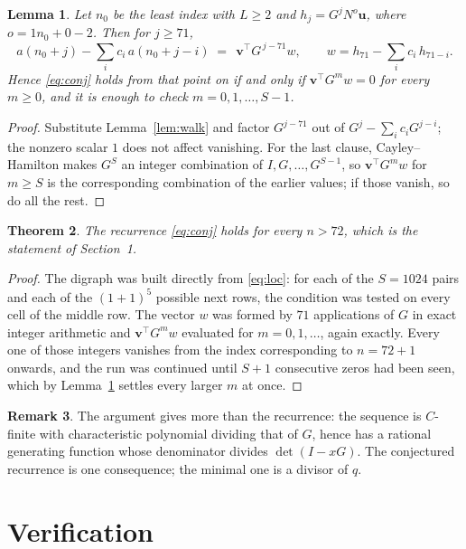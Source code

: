 \documentclass[11pt,a4paper]{article}
\theoremstyle{plain}
\newtheorem{theorem}{Theorem}
\newtheorem{lemma}[theorem]{Lemma}
\theoremstyle{definition}
\newtheorem{remark}[theorem]{Remark}
\begin{document}
\begin{lemma}\label{lem:crit}
Let $n_0$ be the least index with $L\ge2$ and $h_j=G^{j}N^{o}\mathbf{u}$, where
$o=1n_0+0-2$. Then for $j\ge71$,
\[
a(n_0+j)-\sum_i c_i\,a(n_0+j-i)\;=\;\,\mathbf{v}^{\!\top}G^{\,j-71}w,
\qquad w=h_{71}-\sum_i c_i\,h_{71-i} .
\]
Hence \eqref{eq:conj} holds from that point on if and only if
$\mathbf{v}^{\!\top}G^{m}w=0$ for every $m\ge0$, and it is enough to check
$m=0,1,\dots,S-1$.
\end{lemma}

\begin{proof}
Substitute Lemma~\ref{lem:walk} and factor $G^{j-71}$ out of
$G^{j}-\sum_ic_iG^{j-i}$; the nonzero scalar $1$ does not affect
vanishing. For the last clause, Cayley--Hamilton makes $G^{S}$ an integer combination of
$I,G,\dots,G^{S-1}$, so $\mathbf{v}^{\!\top}G^{m}w$ for $m\ge S$ is the corresponding
combination of the earlier values; if those vanish, so do all the rest.
\end{proof}

\begin{theorem}
The recurrence \eqref{eq:conj} holds for every $n>72$, which is the statement of
Section~1.
\end{theorem}

\begin{proof}
The digraph was built directly from \eqref{eq:loc}: for each of the $S=1024$ pairs and each
of the $(1+1)^{5}$ possible next rows, the condition was tested on every cell of
the middle row. The vector $w$ was formed by $71$ applications of $G$ in exact integer
arithmetic and $\mathbf{v}^{\!\top}G^{m}w$ evaluated for $m=0,1,\dots$, again exactly.
Every one of those integers vanishes from the index corresponding to $n=72+1$ onwards,
and the run was continued until $S+1$ consecutive zeros had been seen, which by
Lemma~\ref{lem:crit} settles every larger $m$ at once.
\end{proof}

\begin{remark}
The argument gives more than the recurrence: the sequence is $C$-finite with characteristic
polynomial dividing that of $G$, hence has a rational generating function whose denominator
divides $\det(I-xG)$. The conjectured recurrence is one consequence; the minimal one is a
divisor of $q$.
\end{remark}

\section{Verification}
\end{document}

